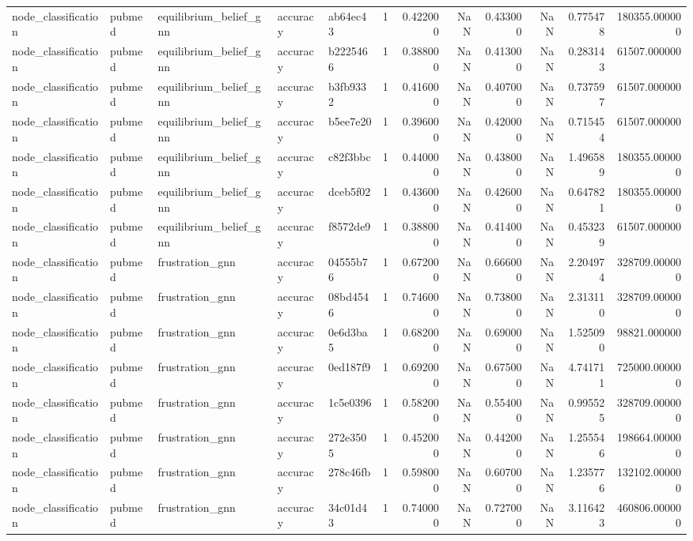 \begin{tabular}{lllllrrrrrrr}
node_classification & pubmed & equilibrium_belief_gnn & accuracy & ab64ec43 & 1 & 0.422000 & NaN & 0.433000 & NaN & 0.775478 & 180355.000000 \\
node_classification & pubmed & equilibrium_belief_gnn & accuracy & b2225466 & 1 & 0.388000 & NaN & 0.413000 & NaN & 0.283143 & 61507.000000 \\
node_classification & pubmed & equilibrium_belief_gnn & accuracy & b3fb9332 & 1 & 0.416000 & NaN & 0.407000 & NaN & 0.737597 & 61507.000000 \\
node_classification & pubmed & equilibrium_belief_gnn & accuracy & b5ee7e20 & 1 & 0.396000 & NaN & 0.420000 & NaN & 0.715454 & 61507.000000 \\
node_classification & pubmed & equilibrium_belief_gnn & accuracy & c82f3bbc & 1 & 0.440000 & NaN & 0.438000 & NaN & 1.496589 & 180355.000000 \\
node_classification & pubmed & equilibrium_belief_gnn & accuracy & dceb5f02 & 1 & 0.436000 & NaN & 0.426000 & NaN & 0.647821 & 180355.000000 \\
node_classification & pubmed & equilibrium_belief_gnn & accuracy & f8572de9 & 1 & 0.388000 & NaN & 0.414000 & NaN & 0.453239 & 61507.000000 \\
node_classification & pubmed & frustration_gnn & accuracy & 04555b76 & 1 & 0.672000 & NaN & 0.666000 & NaN & 2.204974 & 328709.000000 \\
node_classification & pubmed & frustration_gnn & accuracy & 08bd4546 & 1 & 0.746000 & NaN & 0.738000 & NaN & 2.313110 & 328709.000000 \\
node_classification & pubmed & frustration_gnn & accuracy & 0e6d3ba5 & 1 & 0.682000 & NaN & 0.690000 & NaN & 1.525090 & 98821.000000 \\
node_classification & pubmed & frustration_gnn & accuracy & 0ed187f9 & 1 & 0.692000 & NaN & 0.675000 & NaN & 4.741711 & 725000.000000 \\
node_classification & pubmed & frustration_gnn & accuracy & 1c5e0396 & 1 & 0.582000 & NaN & 0.554000 & NaN & 0.995525 & 328709.000000 \\
node_classification & pubmed & frustration_gnn & accuracy & 272e3505 & 1 & 0.452000 & NaN & 0.442000 & NaN & 1.255546 & 198664.000000 \\
node_classification & pubmed & frustration_gnn & accuracy & 278c46fb & 1 & 0.598000 & NaN & 0.607000 & NaN & 1.235776 & 132102.000000 \\
node_classification & pubmed & frustration_gnn & accuracy & 34c01d43 & 1 & 0.740000 & NaN & 0.727000 & NaN & 3.116423 & 460806.000000 \\

\end{tabular}
